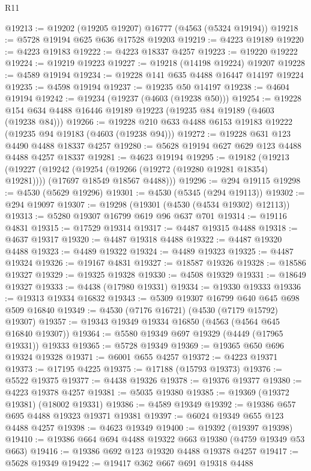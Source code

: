 \begin{lexlean}{R11}
\begin{coremodule}
@19213 := @19202 (@19205 @19207) @16777 (@4563 (@5324 @19194))
@19218 := @5728 @19194 @625 @636 @17528 @19203
@19219 := @4223 @19189
@19220 := @4223 @19183
@19222 := @4223 @18337 @4257
@19223 := @19220 @19222
@19224 := @19219 @19223
@19227 := @19218 (@14198 @19224) @19207
@19228 := @4589 @19194
@19234 := @19228 @141 @635 @4488 @16447 @14197 @19224
@19235 := @4598 @19194
@19237 := @19235 @50 @14197
@19238 := @4604 @19194
@19242 := @19234 (@19237 (@4603 (@19238 @50)))
@19254 := @19228 @154 @634 @4488 @16446 @19189 @19223 (@19235 @84 @19189 (@4603 (@19238 @84)))
@19266 := @19228 @210 @633 @4488 @6153 @19183 @19222 (@19235 @94 @19183 (@4603 (@19238 @94)))
@19272 := @19228 @631 @123 @4490 @4488 @18337 @4257
@19280 := @5628 @19194 @627 @629 @123 @4488 @4488 @4257 @18337
@19281 := @4623 @19194
@19295 := @19182
    (@19213
      (@19227
        (@19242 (@19254 (@19266 (@19272 (@19280 @19281 @18354) @19281))))
        (@17697 @18549 @18567 @4488)))
@19296 := @294 @19115
@19298 := @4530 (@5629 @19296)
@19301 := @4530 (@5345 (@294 @19113))
@19302 := @294 @19097
@19307 := @19298 (@19301 (@4530 (@4534 @19302) @12113))
@19313 := @5280 @19307 @16799 @619 @96 @637 @701
@19314 := @19116 @4831
@19315 := @17529 @19314
@19317 := @4487 @19315 @4488
@19318 := @4637 @19317
@19320 := @4487 @19318 @4488
@19322 := @4487 @19320 @4488
@19323 := @4489 @19322
@19324 := @4489 @19323
@19325 := @4487 @19324
@19326 := @19167 @4831
@19327 := @18587 @19326
@19328 := @18586 @19327
@19329 := @19325 @19328
@19330 := @4508 @19329
@19331 := @18649 @19327
@19333 := @4438 (@17980 @19331)
@19334 := @19330 @19333
@19336 := @19313 @19334 @16832
@19343 := @5309 @19307 @16799 @640 @645 @698 @509 @16840
@19349 := @4530 (@7176 @16721) (@4530 (@7179 @15792) @19307)
@19357 := @19343 @19349 @19334 @16850 (@4563 (@4564 @645 @16840 @19307))
@19364 := @5580 @19349 @697 @19329 (@4449 (@17965 @19331)) @19333
@19365 := @5728 @19349
@19369 := @19365 @650 @696 @19324 @19328
@19371 := @6001 @655 @4257
@19372 := @4223 @19371
@19373 := @17195 @4225
@19375 := @17188 (@15793 @19373)
@19376 := @5522 @19375
@19377 := @4438 @19326
@19378 := @19376 @19377
@19380 := @4223 @19378 @4257
@19381 := @5035 @19380
@19385 := @19369 (@19372 @19381) (@18002 @19331)
@19386 := @4589 @19349
@19392 := @19386 @657 @695 @4488 @19323 @19371 @19381
@19397 := @6024 @19349 @655 @123 @4488 @4257
@19398 := @4623 @19349
@19400 := @19392 (@19397 @19398)
@19410 := @19386 @664 @694 @4488 @19322 @663 @19380 (@4759 @19349 @53 @663)
@19416 := @19386 @692 @123 @19320 @4488 @19378 @4257
@19417 := @5628 @19349
@19422 := @19417 @362 @667 @691 @19318 @4488

\end{coremodule}
\end{lexlean}
